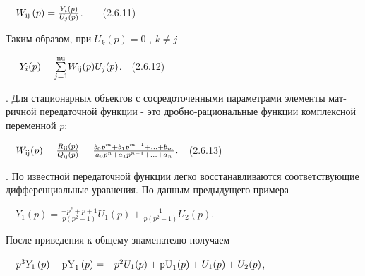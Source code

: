 \documentclass[a4paper]{article}
\newcommand\normalsubformula[1]{\text{\mathversion{normal}$#1$}}
\begin{document}
{\begin{russian}\sffamily
\ \  $W_{\normalsubformula{\text{ij}}}\left(p\right)=\frac{Y_i(p)}{U_j(p)}$.\ \ \ \ (2.6.11)
\end{russian}}

{\begin{russian}\sffamily
Таким образом, при  $U_k(p)=0$ ,  $k\neq j$
\end{russian}}

{\begin{russian}\sffamily
\ \  $ $ $Y_i(p)=\overset{\normalsubformula{\text{nu}}}{\underset{j=1}{\sum
}}W_{\normalsubformula{\text{ij}}}(p)U_j(p)$.\ \ (2.6.12)
\end{russian}}

{\begin{russian}. Для стационарных объектов с сосредоточенными параметрами элементы матричной передаточной функции - это
дробно-рациональные функции комплексной переменной  $p$:
\end{russian}}

{\begin{russian}\sffamily
\ \ 
$W_{\normalsubformula{\text{ij}}}(p)=\frac{R_{\normalsubformula{\text{ij}}}(p)}{Q_{\normalsubformula{\text{ij}}}(p)}=\frac{b_0p^m+b_1p^{m-1}+...+b_m}{a_0p^n+a_1p^{n-1}+...+a_n}_{}^{}.$\ \ (2.6.13)\ \ 
\end{russian}}

{\begin{russian}. По известной передаточной функции легко восстанавливаются соответствующие дифференциальные уравнения. По данным
предыду­щего примера
\end{russian}}


\bigskip


\bigskip


\bigskip

{\begin{russian}\sffamily
\ \  $Y_1(p)=\frac{-p^2+p+1}{p(p^2-1)}U_1(p)+\frac 1{p(p^2-1)}U_2(p)$.
\end{russian}}

{\begin{russian}\sffamily
После приведения к общему знаменателю получаем
\end{russian}}

{\begin{russian}\sffamily
\ \ 
$p^3Y_1\left(p\right)-\normalsubformula{\text{pY}}_1\left(p\right)=-p^2U_1(p)+\normalsubformula{\text{pU}}_1(p)+U_1(p)+U_2(p)$,
\end{russian}}
\end{document}
